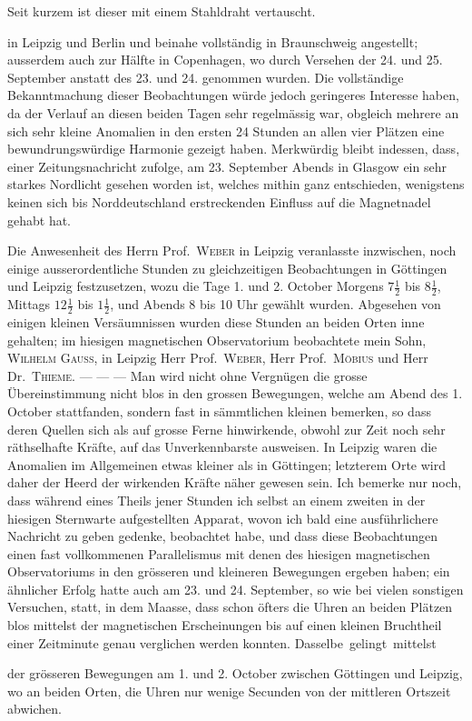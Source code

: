 \expandafter\def\csname HistoricalNoteText536\endcsname{Seit kurzem ist dieser mit einem Stahldraht vertauscht.}
\par\clearpage
{}\noindent in Leipzig und Berlin und beinahe vollständig in Braunschweig angestellt; ausserdem auch zur Hälfte in Copenhagen, wo durch Versehen der 24. und 25. September anstatt des 23. und 24. genommen wurden. Die vollständige Bekanntmachung dieser Beobachtungen würde jedoch geringeres Interesse haben, da der Verlauf an diesen beiden Tagen sehr regelmässig war, obgleich mehrere an sich sehr kleine Anomalien in den ersten 24 Stunden an allen vier Plätzen eine bewundrungswürdige Harmonie gezeigt haben. Merkwürdig bleibt indessen, dass, einer Zeitungsnachricht zufolge, am 23. September Abends in Glasgow ein sehr starkes Nordlicht gesehen worden ist, welches mithin ganz entschieden, wenigstens keinen sich bis Norddeutschland erstreckenden Einfluss auf die Magnetnadel gehabt hat.

Die Anwesenheit des Herrn Prof.\ \textsc{Weber} in Leipzig veranlasste inzwischen, noch einige ausserordentliche Stunden zu gleichzeitigen Beobachtungen in Göttingen und Leipzig festzusetzen, wozu die Tage 1. und 2. October Morgens $7\tfrac12$ bis $8\tfrac12$, Mittags $12\tfrac12$ bis $1\tfrac12$, und Abends 8 bis 10 Uhr gewählt wurden. Abgesehen von einigen kleinen Versäumnissen wurden diese Stunden an beiden Orten inne gehalten; im hiesigen magnetischen Observatorium beobachtete mein Sohn, \textsc{Wilhelm Gauss}, in Leipzig Herr Prof.\ \textsc{Weber}, Herr Prof.\ \textsc{Möbius} und Herr Dr.\ \textsc{Thieme}. — — — Man wird nicht ohne Vergnügen die grosse Übereinstimmung nicht blos in den grossen Bewegungen, welche am Abend des 1. October stattfanden, sondern fast in sämmtlichen kleinen bemerken, so dass deren Quellen sich als auf grosse Ferne hinwirkende, obwohl zur Zeit noch sehr räthselhafte Kräfte, auf das Unverkennbarste ausweisen. In Leipzig waren die Anomalien im Allgemeinen etwas kleiner als in Göttingen; letzterem Orte wird daher der Heerd der wirkenden Kräfte näher gewesen sein. Ich bemerke nur noch, dass während eines Theils jener Stunden ich selbst an einem zweiten in der hiesigen Sternwarte aufgestellten Apparat, wovon ich bald eine ausführlichere Nachricht zu geben gedenke, beobachtet habe, und dass diese Beobachtungen einen fast vollkommenen Parallelismus mit denen des hiesigen magnetischen Observatoriums in den grösseren und kleineren Bewegungen ergeben haben; ein ähnlicher Erfolg hatte auch am 23. und 24. September, so wie bei vielen sonstigen Versuchen, statt, in dem Maasse, dass schon öfters die Uhren an beiden Plätzen blos mittelst der magnetischen Erscheinungen bis auf einen kleinen Bruchtheil einer Zeitminute genau verglichen werden konnten. Dasselbe~gelingt~mittelst
\par\clearpage
{}
\noindent der grösseren Bewegungen am 1. und 2. October zwischen Göttingen und Leipzig, wo an beiden Orten, die Uhren nur wenige Secunden von der mittleren Ortszeit abwichen.

